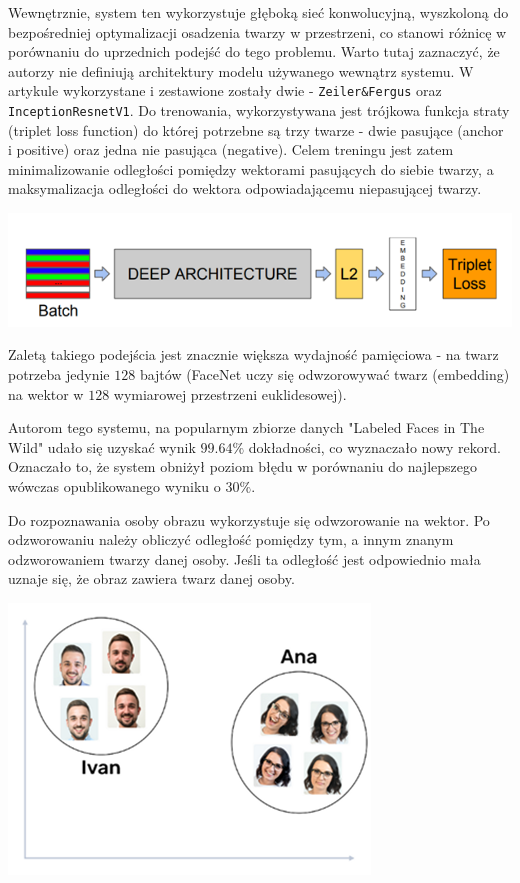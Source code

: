 \documentclass[11pt]{article}
\begin{document}
    Wewnętrznie, system ten wykorzystuje głęboką sieć konwolucyjną, wyszkoloną do bezpośredniej optymalizacji
    osadzenia twarzy w przestrzeni, co stanowi różnicę w porównaniu do uprzednich podejść do tego problemu. Warto tutaj zaznaczyć, że autorzy
    nie definiują architektury modelu używanego wewnątrz systemu. W artykule wykorzystane i zestawione zostały dwie - \texttt{Zeiler\&Fergus} oraz \texttt{InceptionResnetV1}. 
    Do trenowania, wykorzystywana jest trójkowa funkcja straty (triplet loss function) do której potrzebne są trzy
    twarze - dwie pasujące (anchor i positive) oraz jedna nie pasująca (negative).
    Celem treningu jest zatem minimalizowanie odległości pomiędzy wektorami pasujących do siebie twarzy, a maksymalizacja odległości
    do wektora odpowiadającemu niepasującej twarzy.

    \begin{center}
        \includegraphics{architecture.png}
    \end{center}

    Zaletą takiego podejścia jest znacznie większa wydajność pamięciowa - na twarz potrzeba jedynie $128$ bajtów (FaceNet uczy się odwzorowywać
    twarz (embedding) na wektor w $128$ wymiarowej przestrzeni euklidesowej).

    Autorom tego systemu, na popularnym zbiorze danych "Labeled Faces in The Wild" udało się uzyskać wynik $99.64\%$ dokładności,
    co wyznaczało nowy rekord. Oznaczało to, że system obniżył poziom błędu w porównaniu do najlepszego wówczas opublikowanego wyniku o $30\%$.

    Do rozpoznawania osoby obrazu wykorzystuje się odwzorowanie na wektor. Po odzworowaniu należy obliczyć odległość pomiędzy tym, a innym znanym odzworowaniem twarzy danej osoby.
    Jeśli ta odległość jest odpowiednio mała uznaje się, że obraz zawiera twarz danej osoby.
    \begin{center}
    \includegraphics{grouped_faces.png}
    \end{center}
\end{document}
